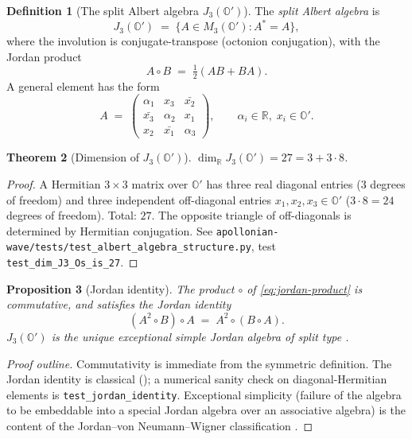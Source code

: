 \documentclass[11pt,a4paper]{article}
\theoremstyle{plain}
\newtheorem{theorem}{Theorem}[section]
\newtheorem{proposition}[theorem]{Proposition}
\theoremstyle{definition}
\newtheorem{definition}[theorem]{Definition}
\theoremstyle{remark}
\numberwithin{equation}{section}
\providecommand{\R}{\mathbb{R}}
\providecommand{\Os}{\mathbb{O}'}
\providecommand{\half}{\tfrac{1}{2}}
\begin{document}
\begin{definition}[The split Albert algebra $J_3(\Os)$]
\label{def:J3O}
The \emph{split Albert algebra} is
\begin{equation}
  J_3(\Os) \;=\; \{ A \in M_3(\Os) : A^* = A \},
  \label{eq:J3-def}
\end{equation}
where the involution is conjugate-transpose (octonion
conjugation), with the Jordan product
\begin{equation}
  A \circ B \;=\; \half (A B + B A).
  \label{eq:jordan-product}
\end{equation}
A general element has the form
\begin{equation}
  A \;=\; \begin{pmatrix} \alpha_1 & x_3 & \bar{x_2} \\
                          \bar{x_3} & \alpha_2 & x_1 \\
                          x_2 & \bar{x_1} & \alpha_3 \end{pmatrix},
  \qquad \alpha_i \in \R,\; x_i \in \Os.
  \label{eq:hermitian-form}
\end{equation}
\end{definition}

\begin{theorem}[Dimension of $J_3(\Os)$]
\label{thm:dim-J3}
$\dim_\R J_3(\Os) = 27 = 3 + 3 \cdot 8$.
\end{theorem}

\begin{proof}
A Hermitian $3\times 3$ matrix over $\Os$ has three real diagonal
entries ($3$ degrees of freedom) and three independent off-diagonal
entries $x_1, x_2, x_3 \in \Os$ ($3 \cdot 8 = 24$ degrees of
freedom).  Total: $27$.  The opposite triangle of off-diagonals is
determined by Hermitian conjugation.  See
\texttt{apollonian-wave/tests/test\_albert\_algebra\_structure.py},
test \texttt{test\_dim\_J3\_Os\_is\_27}.
\end{proof}

\begin{proposition}[Jordan identity]
\label{prop:jordan-identity}
The product $\circ$ of \eqref{eq:jordan-product} is commutative,
and satisfies the Jordan identity
\[
  (A^2 \circ B) \circ A \;=\; A^2 \circ (B \circ A).
\]
$J_3(\Os)$ is the unique exceptional simple Jordan algebra of
split type \cite{jordan-vonNeumann-wigner1934,albert1934,jacobson1968}.
\end{proposition}

\begin{proof}[Proof outline]
Commutativity is immediate from the symmetric definition.  The
Jordan identity is classical (\cite{albert1934}); a numerical
sanity check on diagonal-Hermitian elements is
\texttt{test\_jordan\_identity}.  Exceptional simplicity (failure
of the algebra to be embeddable into a special Jordan algebra over
an associative algebra) is the content of the Jordan--von
Neumann--Wigner classification \cite{jordan-vonNeumann-wigner1934}.
\end{proof}
\end{document}
